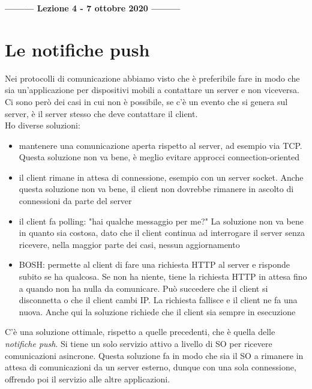\begin{center}
    \textbf{--------- Lezione 4 - 7 ottobre 2020 ---------}
\end{center}

\section{Le notifiche push}
Nei protocolli di comunicazione abbiamo visto che è preferibile fare in modo che sia un’applicazione per dispositivi mobili a contattare un server e non viceversa. 
Ci sono però dei casi in cui non è possibile, se c'è un evento che si genera sul server, è il server stesso che deve contattare il client. 
\\ Ho diverse soluzioni:
\begin{itemize}
    \item mantenere una comunicazione aperta rispetto al server, ad esempio via TCP. 
    \\ Questa soluzione non va bene, è meglio evitare approcci connection-oriented
    \item il client rimane in attesa di connessione, esempio con un server socket. 
    Anche questa soluzione non va bene, il client non dovrebbe rimanere in ascolto di connessioni da parte del server
    \item il client fa polling: "hai qualche messaggio per me?"
    La soluzione non va bene in quanto sia costosa, dato che il client continua ad interrogare il server senza ricevere, nella maggior parte dei casi, nessun aggiornamento
    \item BOSH: permette al client di fare una richiesta HTTP al server e risponde subito se ha qualcosa. Se non ha niente, tiene la richiesta HTTP in attesa fino a quando non ha nulla da comunicare. 
    Può succedere che il client si disconnetta o che il client cambi IP. La richiesta fallisce e il client ne fa una nuova.
    Anche qui la soluzione richiede che il client sia sempre in esecuzione
\end{itemize}

C'è una soluzione ottimale, rispetto a quelle precedenti, che è quella delle \textit{notifiche push}. Si tiene un solo servizio attivo a livello di SO per ricevere comunicazioni asincrone. 
Questa soluzione fa in modo che sia il SO a rimanere in attesa di comunicazioni da un server esterno, dunque con una sola connessione, offrendo poi il servizio alle altre applicazioni. 

